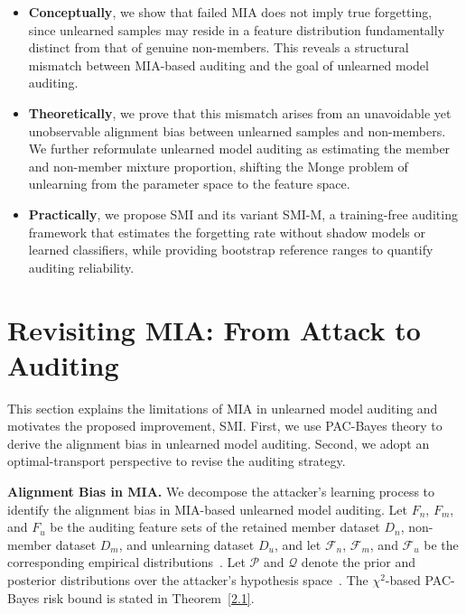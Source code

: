 \documentclass{article}
\theoremstyle{plain}
\theoremstyle{definition}
\theoremstyle{remark}
\begin{document}
\begin{itemize}
    \item \textbf{Conceptually}, we show that failed MIA does not imply true forgetting, since unlearned samples may reside in a feature distribution fundamentally distinct from that of genuine non-members. This reveals a structural mismatch between MIA-based auditing and the goal of unlearned model auditing.

    \item \textbf{Theoretically}, we prove that this mismatch arises from an unavoidable yet unobservable alignment bias between unlearned samples and non-members. We further reformulate unlearned model auditing as estimating the member and non-member mixture proportion, shifting the Monge problem of unlearning from the parameter space to the feature space.

    \item \textbf{Practically}, we propose SMI and its variant SMI-M, a training-free auditing framework that estimates the forgetting rate without shadow models or learned classifiers, while providing bootstrap reference ranges to quantify auditing reliability.
\end{itemize}



















\section{Revisiting MIA: From Attack to Auditing}
This section explains the limitations of MIA in unlearned model auditing and motivates the proposed improvement, SMI.  First, we use PAC-Bayes theory to derive the alignment bias in unlearned model auditing. Second, we adopt an optimal-transport perspective to revise the auditing strategy.

\textbf{Alignment Bias in MIA.}
We decompose the attacker’s learning process to identify the alignment bias in MIA-based unlearned model auditing. Let $F_n$, $F_m$, and $F_u$ be the auditing feature sets of the retained member dataset $D_n$, non-member dataset $D_m$, and unlearning dataset $D_u$, and let $\mathcal F_n$, $\mathcal F_m$, and $\mathcal F_u$ be the corresponding empirical distributions~\cite{Unleark,MIAD}. Let $\mathcal P$ and $\mathcal Q$ denote the prior and posterior distributions over the attacker’s hypothesis space~\cite{lilun1,lilun2}. The $\chi^2$-based PAC-Bayes risk bound is stated in Theorem~\ref{2.1}.
\end{document}
